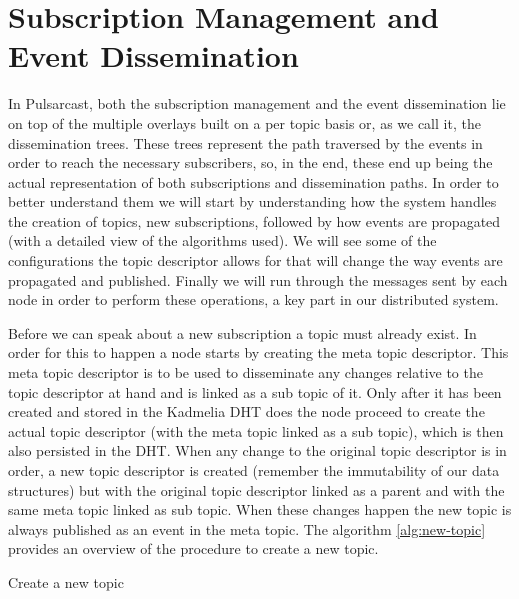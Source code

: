 \section{Subscription Management and Event Dissemination}\label{subscription-management-event-dissemination}

In Pulsarcast, both the subscription management and the event dissemination lie
on top of the multiple overlays built on a per topic basis or, as we call it,
the dissemination trees. These trees represent the path traversed by the events
in order to reach the necessary subscribers, so, in the end, these end up being
the actual representation of both subscriptions and dissemination paths. In
order to better understand them we will start by understanding how the system
handles the creation of topics, new subscriptions, followed by how events are
propagated (with a detailed view of the algorithms used). We will see some of
the configurations the topic descriptor allows for that will change the way
events are propagated and published. Finally we will run through the messages
sent by each node in order to perform these operations, a key part in our
distributed system.

Before we can speak about a new subscription a topic must already exist. In
order for this to happen a node starts by creating the meta topic descriptor.
This meta topic descriptor is to be used to disseminate any changes relative to
the topic descriptor at hand and is linked as a sub topic of it. Only after it
has been created and stored in the Kadmelia DHT does the node proceed to create
the actual topic descriptor (with the meta topic linked as a sub topic), which
is then also persisted in the DHT. When any change to the original topic
descriptor is in order, a new topic descriptor is created (remember the
immutability of our data structures) but with the original topic descriptor
linked as a parent and with the same meta topic linked as sub topic. When these
changes happen the new topic is always published as an event in the meta topic.
The algorithm \ref{alg:new-topic} provides an overview of the procedure to
create a new topic.


\vspace{8pt}
\begin{algorithm}[H]
  \SetAlgoLined
  \caption{Create a new topic}
	\label{alg:new-topic}
\end{algorithm}
\vspace{8pt}

